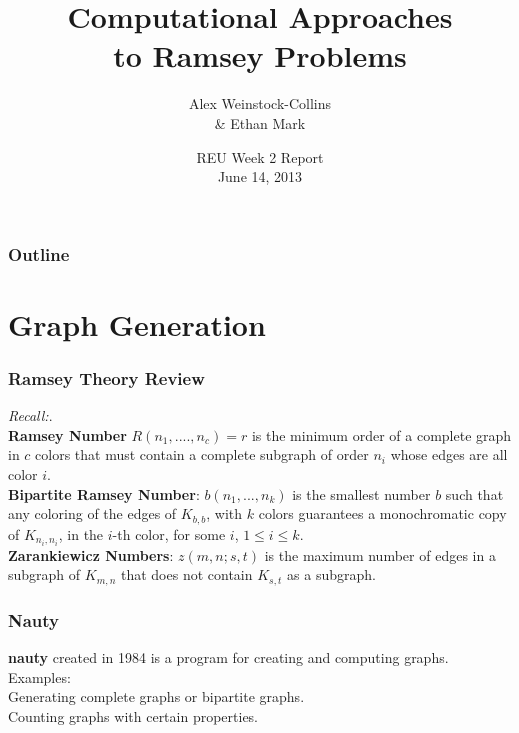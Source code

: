 \documentclass[pdf,hyperref={urlbordercolor={0 1 1}},xcolor=pdftex,dvipsnames]{beamer}
\title[Ramsey Theory: Computational Approaches]
{Computational Approaches\\ to Ramsey Problems}
\author[Alex Weinstock-Collins \& Ethan Mark]
  {{Alex Weinstock-Collins\\\vspace{.1cm} \& Ethan Mark}\\
}
\date{
  REU Week 2 Report\\ \vspace{.25cm}
  June 14, 2013
}
\begin{document}
\begin{frame}
  \titlepage
\end{frame}

\begin{frame}
  \frametitle{Outline}
  \tableofcontents
\end{frame}

\section{Graph Generation}

\begin{frame}
  \frametitle{Ramsey Theory Review}
  \textit{Recall:}. \\\vspace{.25cm}
 \textbf{Ramsey Number} $R(n_1,....,n_c)=r$ is the minimum order of a complete graph in $c$ colors that must contain a complete subgraph of order  $n_i$ whose edges are all color $i$.  \\\vspace{.25cm}
\textbf{Bipartite Ramsey Number}: $b(n_1,...,n_k)$ is the smallest number $b$ such that any coloring of the edges of $K_{b,b}$, with $k$ colors guarantees a monochromatic copy of $K_{n_i,n_i}$, in the $i$-th color, for some $i$, $1\le i \le k$.\\\vspace{.25cm} 
\textbf{Zarankiewicz Numbers}: $z(m,n;s,t)$ is the maximum number of edges in a subgraph of $K_{m,n}$ that does not contain $K_{s,t}$ as a subgraph. \\\vspace{.25cm}
\end{frame}
\begin{frame}
  \frametitle{Nauty}
 \textbf{nauty} created in 1984 is a program for creating and computing graphs. \\\vspace{.25cm}
Examples: \\\vspace{.25cm}
Generating complete graphs or bipartite graphs. \\\vspace{.25cm}
Counting graphs with certain properties. \\\vspace{.25cm}


\end{frame}
\end{document}
